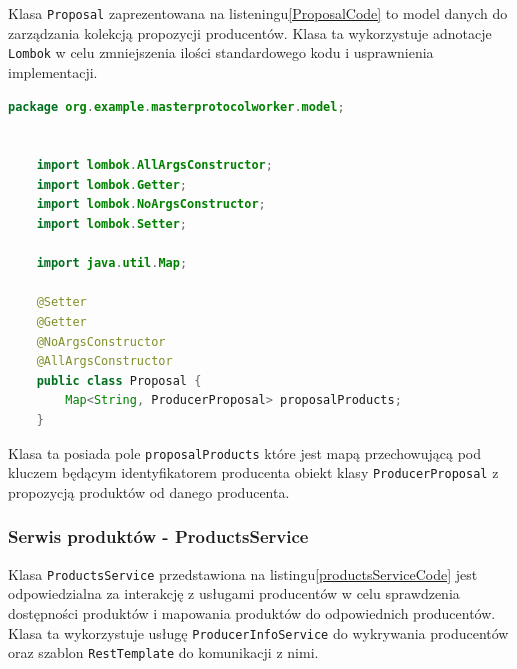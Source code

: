 Klasa \verb|Proposal| zaprezentowana na listeningu\ref{ProposalCode} to model danych do zarządzania kolekcją propozycji producentów. Klasa ta wykorzystuje adnotacje \verb|Lombok| w celu zmniejszenia ilości standardowego kodu i usprawnienia implementacji.

\begin{lstlisting}[language=Java, caption=Kod klasy Proposal,label=ProposalCode]
    package org.example.masterprotocolworker.model;
    
    
    import lombok.AllArgsConstructor;
    import lombok.Getter;
    import lombok.NoArgsConstructor;
    import lombok.Setter;
    
    import java.util.Map;
    
    @Setter
    @Getter
    @NoArgsConstructor
    @AllArgsConstructor
    public class Proposal {
        Map<String, ProducerProposal> proposalProducts;
    }
\end{lstlisting}

Klasa ta posiada pole \verb|proposalProducts| które jest mapą przechowującą pod kluczem będącym identyfikatorem producenta obiekt klasy \verb|ProducerProposal| z propozycją produktów od danego producenta.

\subsubsection{Serwis produktów - ProductsService}

Klasa \verb|ProductsService| przedstawiona na listingu\ref{productsServiceCode} jest odpowiedzialna za interakcję z usługami producentów w celu sprawdzenia dostępności produktów i mapowania produktów do odpowiednich producentów. Klasa ta wykorzystuje usługę \verb|ProducerInfoService| do wykrywania producentów oraz szablon \verb|RestTemplate| do komunikacji z nimi. 

